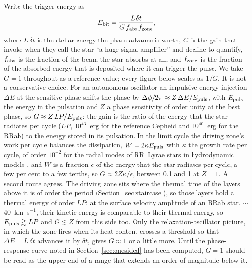 \documentclass[final,5p]{elsarticle}
\begin{document}
Write the trigger energy as
\begin{equation}
  E_{\rm bit} = \frac{L\,\delta t}{G\, f_{\rm abs}\, f_{\rm zone}} ,
  \label{eq:ebit}
\end{equation}
where $L\,\delta t$ is the stellar energy the phase advance is worth, $G$ is the gain that \citet{Learned2008} invoke when they call the star ``a huge signal amplifier'' and decline to quantify, $f_{\rm abs}$ is the fraction of the beam the star absorbs at all, and $f_{\rm zone}$ is the fraction of the absorbed energy that is deposited where it can trigger the pulse. We take $G=1$ throughout as a reference value; every figure below scales as $1/G$. It is not a conservative choice. For an autonomous oscillator an impulsive energy injection $\Delta E$ at the sensitive phase shifts the phase by $\Delta\phi/2\pi\approx Z\,\Delta E/E_{\rm puls}$, with $E_{\rm puls}$ the energy in the pulsation and $Z$ a phase sensitivity of order unity at the best phase, so $G\approx Z\,LP/E_{\rm puls}$: the gain is the ratio of the energy that the star radiates per cycle ($LP$, $10^{43}$~erg for the reference Cepheid and $10^{40}$~erg for the RRab) to the energy stored in its pulsation. In the limit cycle the driving zone's work per cycle balances the dissipation, $W=2\kappa E_{\rm puls}$ with $\kappa$ the growth rate per cycle, of order $10^{-2}$ for the radial modes of RR~Lyrae stars in hydrodynamic models \citep{Bono1997, Kollath2011}, and $W$ is a fraction $\epsilon$ of the energy that the star radiates per cycle, a few per cent to a few tenths, so $G\approx2Z\kappa/\epsilon$, between 0.1 and 1 at $Z=1$. A second route agrees. The driving zone sits where the thermal time of the layers above it is of order the period (Section~\ref{sec:staircase}), so those layers hold a thermal energy of order $LP$; at the surface velocity amplitude of an RRab star, $\sim$40~km~s$^{-1}$, their kinetic energy is comparable to their thermal energy, so $E_{\rm puls}\gtrsim LP$ and $G\lesssim Z$ from this side too. Only the relaxation-oscillator picture, in which the zone fires when its heat content crosses a threshold so that $\Delta E=L\,\delta t$ advances it by $\delta t$, gives $G\approx1$ or a little more. Until the phase-response curve noted in Section~\ref{sec:onesided} has been computed, $G=1$ should be read as the upper end of a range that extends an order of magnitude below it.
\end{document}
